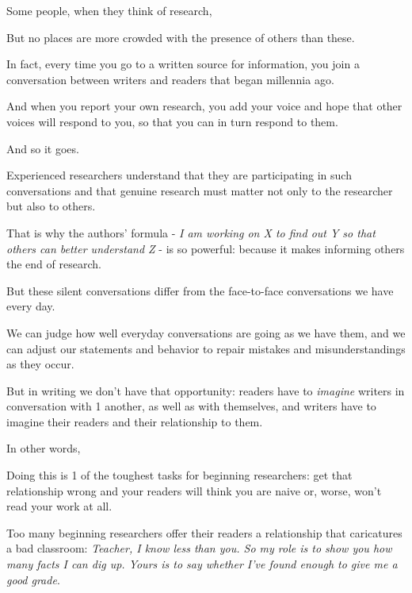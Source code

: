 \documentclass[oneside]{book}
\numberwithin{equation}{section}
\begin{document}
Some people, when they think of research, 

But no places are more crowded with the presence of others than these.


In fact, every time you go to a written source for information, you join a conversation between writers and readers that began millennia ago.

And when you report your own research, you add your voice and hope that other voices will respond to you, so that you can in turn respond to them.

And so it goes.

%
Experienced researchers understand that they are participating in such conversations and that genuine research must matter not only to the researcher but also to others.

That is why the authors' formula - \textit{I am working on X to find out Y so that others can better understand Z} - is so powerful: because it makes informing others the end of research.

%
But these silent conversations differ from the face-to-face conversations we have every day.

We can judge how well everyday conversations are going as we have them, and we can adjust our statements and behavior to repair mistakes and misunderstandings as they occur.

But in writing we don't have that opportunity: readers have to \textit{imagine} writers in conversation with 1 another, as well as with themselves, and writers have to imagine their readers and their relationship to them.

In other words, 

%
Doing this is 1 of the toughest tasks for beginning researchers: get that relationship wrong and your readers will think you are naive or, worse, won't read your work at all.

Too many beginning researchers offer their readers a relationship that caricatures a bad classroom: \textit{Teacher, I know less than you. So my role is to show you how many facts I can dig up. Yours is to say whether I've found enough to give me a good grade}.
\end{document}
